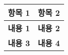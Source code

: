 \begin{tabular}{|c|c|}
\toprule
\textbf{항목 1} & \textbf{항목 2} \\ \midrule
\textbf{내용 1} & \textbf{내용 2} \\ \hline
\textbf{내용 3} & \textbf{내용 4} \\ \bottomrule
\end{tabular}